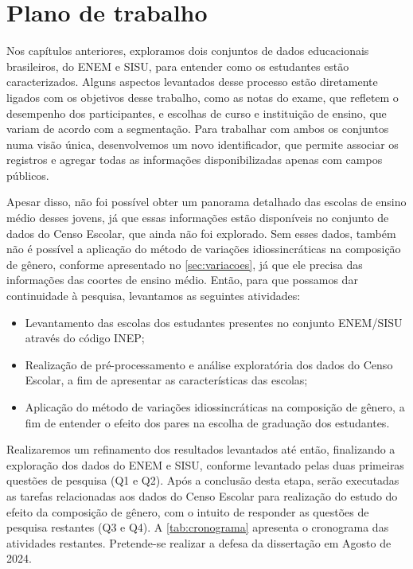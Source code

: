 \chapter{Plano de trabalho}
\label{cap:plano-trabalho}

Nos capítulos anteriores, exploramos dois conjuntos de dados educacionais brasileiros, do ENEM e SISU, para entender como os estudantes estão caracterizados. Alguns aspectos levantados desse processo estão diretamente ligados com os objetivos desse trabalho, como as notas do exame, que refletem o desempenho dos participantes, e escolhas de curso e instituição de ensino, que variam de acordo com a segmentação. Para trabalhar com ambos os conjuntos numa visão única, desenvolvemos um novo identificador, que permite associar os registros e agregar todas as informações disponibilizadas apenas com campos públicos. 

Apesar disso, não foi possível obter um panorama detalhado das escolas de ensino médio desses jovens, já que essas informações estão disponíveis no conjunto de dados do Censo Escolar, que ainda não foi explorado. Sem esses dados, também não é possível a aplicação do método de variações idiossincráticas na composição de gênero, conforme apresentado no \autoref{sec:variacoes}, já que ele precisa das informações das coortes de ensino médio. Então, para que possamos dar continuidade à pesquisa, levantamos as seguintes atividades:

\begin{itemize}
    \item Levantamento das escolas dos estudantes presentes no conjunto ENEM/SISU através do código INEP;
    \item Realização de pré-processamento e análise exploratória dos dados do Censo Escolar, a fim de apresentar as características das escolas;
    \item Aplicação do método de variações idiossincráticas na composição de gênero, a fim de entender o efeito dos pares na escolha de graduação dos estudantes.
\end{itemize}

  Realizaremos um refinamento dos resultados levantados até então, finalizando a exploração dos dados do ENEM e SISU, conforme levantado pelas duas primeiras questões de pesquisa (Q1 e Q2). Após a conclusão desta etapa, serão executadas as tarefas relacionadas aos dados do Censo Escolar para realização do estudo do efeito da composição de gênero, com o intuito de responder as questões de pesquisa restantes (Q3 e Q4). A \autoref{tab:cronograma} apresenta o cronograma das atividades restantes. Pretende-se realizar a defesa da dissertação em Agosto de 2024.

